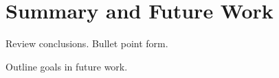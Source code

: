 \section{Summary and Future Work}

Review conclusions.  Bullet point form.

Outline goals in future work.